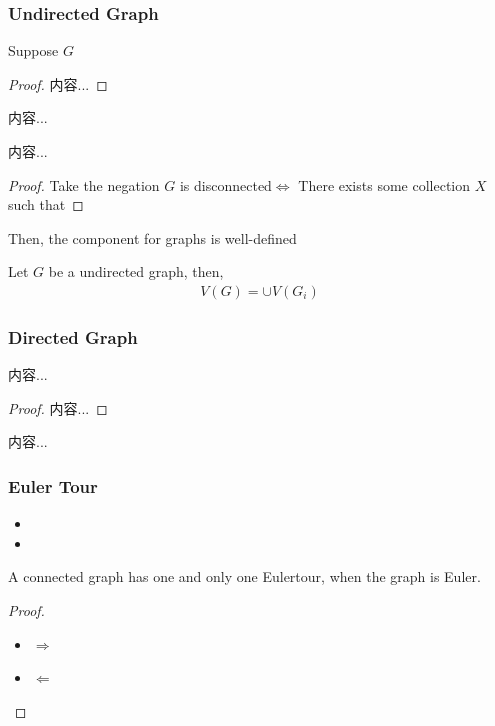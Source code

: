 \documentclass[Total.tex]{subfiles}
\begin{document}
			\subsubsection{Undirected Graph}
			\begin{lemma}
				Suppose $G$
			\end{lemma}
			\begin{proof}
				内容...
			\end{proof}
			
			\begin{Def}
				内容...
			\end{Def}
			\begin{proposition}
				内容...
			\end{proposition}
			\begin{proof}
				Take the negation $G$ is disconnected$\Leftrightarrow$ There exists some collection $X$ such that 
			\end{proof}
			
			Then, the component for graphs is well-defined
			\begin{Def}
				Let $G$ be a undirected graph, then,
				\begin{gather*}
					V(G)=\cup V(G_i)
				\end{gather*}
			\end{Def}
			\subsubsection{Directed Graph}
				\begin{proposition}
					内容...
				\end{proposition}
				\begin{proof}
					内容...
				\end{proof}
				\begin{Def}
					内容...
				\end{Def}
			\subsubsection{Euler Tour}
				\begin{Def}
					\begin{itemize}
						\item 
						\item 
					\end{itemize}
				\end{Def}
				\begin{proposition}
					A connected graph has one and only one Eulertour, when the graph is Euler.
				\end{proposition}
				\begin{proof}
					\begin{itemize}
						\item $\Rightarrow$
						\item $\Leftarrow$
					\end{itemize}
				\end{proof}
\end{document}
